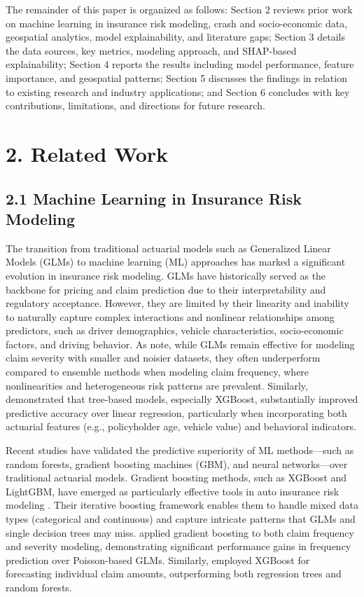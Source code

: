 \documentclass[
  number,
  review,
  3p]{elsarticle}
\begin{document}
The remainder of this paper is organized as follows: Section 2 reviews
prior work on machine learning in insurance risk modeling, crash and
socio-economic data, geospatial analytics, model explainability, and
literature gaps; Section 3 details the data sources, key metrics,
modeling approach, and SHAP-based explainability; Section 4 reports the
results including model performance, feature importance, and geospatial
patterns; Section 5 discusses the findings in relation to existing
research and industry applications; and Section 6 concludes with key
contributions, limitations, and directions for future research.

\section{2. Related Work}\label{related-work}

\subsection{\texorpdfstring{\textbf{2.1 Machine Learning in Insurance
Risk
Modeling}}{2.1 Machine Learning in Insurance Risk Modeling}}\label{machine-learning-in-insurance-risk-modeling}

The transition from traditional actuarial models such as Generalized
Linear Models (GLMs) to machine learning (ML) approaches has marked a
significant evolution in insurance risk modeling. GLMs have historically
served as the backbone for pricing and claim prediction due to their
interpretability and regulatory acceptance. However, they are limited by
their linearity and inability to naturally capture complex interactions
and nonlinear relationships among predictors, such as driver
demographics, vehicle characteristics, socio-economic factors, and
driving behavior. As \citet{clemente} note, while GLMs remain effective
for modeling claim severity with smaller and noisier datasets, they
often underperform compared to ensemble methods when modeling claim
frequency, where nonlinearities and heterogeneous risk patterns are
prevalent. Similarly, \citet{jonkheijm} demonstrated that tree-based
models, especially XGBoost, substantially improved predictive accuracy
over linear regression, particularly when incorporating both actuarial
features (e.g., policyholder age, vehicle value) and behavioral
indicators.

Recent studies have validated the predictive superiority of ML
methods---such as random forests, gradient boosting machines (GBM), and
neural networks---over traditional actuarial models. Gradient boosting
methods, such as XGBoost and LightGBM, have emerged as particularly
effective tools in auto insurance risk modeling \citep{henckaerts}.
Their iterative boosting framework enables them to handle mixed data
types (categorical and continuous) and capture intricate patterns that
GLMs and single decision trees may miss. \citet{clemente} applied
gradient boosting to both claim frequency and severity modeling,
demonstrating significant performance gains in frequency prediction over
Poisson-based GLMs. Similarly, \citet{jonkheijm} employed XGBoost for
forecasting individual claim amounts, outperforming both regression
trees and random forests.
\end{document}
